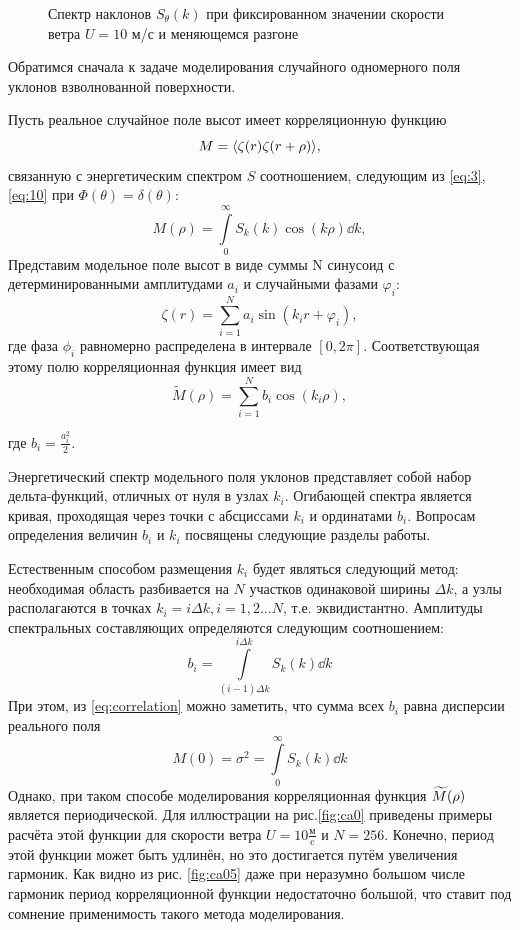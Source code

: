 \begin{figure}[h!]
\begin{minipage}{0.49\linewidth}
			\caption{Спектр наклонов $S_{\theta}(k)$ при фиксированном значении скорости ветра 
			$U=10$ м/с и меняющемся разгоне}		
			\label{fig:full_spectrum4}
	\end{minipage}
\end{figure}
Обратимся сначала к задаче моделирования случайного одномерного поля уклонов взволнованной поверхности. 

Пусть реальное случайное поле высот имеет корреляционную функцию 
\begin{equation}
	M=\langle\zeta(r) \zeta(r+\rho)\rangle,
\end{equation} связанную с энергетическим спектром $S$ соотношением, следующим из \eqref{eq:3}, \eqref{eq:10} при $\Phi(\theta)=\delta(\theta)$:
\begin{equation}
	\label{eq:correlation}
	M(\rho)= \int\limits_0^{\infty} S_k(k)\cos(k \rho) \dd{k}, 
\end{equation}
Представим модельное поле высот в виде суммы N синусоид с детерминированными амплитудами $a_i$ и случайными фазами $\varphi_i$:
\begin{equation}
	\zeta(r)=\sum_{i=1}^N a_i \sin(k_ir+\varphi_i), 
\end{equation}
где фаза $\phi_i$ равномерно распределена в интервале $[0,2\pi]$. Соответствующая этому полю корреляционная функция имеет вид
\begin{equation}
	\widetilde M(\rho)=\sum\limits_{i=1}^N b_i \cos(k_i \rho),
\end{equation}

где $b_i=\frac{a_i^2}{2}$.

Энергетический спектр модельного поля уклонов представляет собой набор дельта-функций, отличных от нуля в узлах $k_i$. Огибающей спектра является кривая, проходящая через точки с абсциссами $k_i$ и ординатами $b_i$. Вопросам определения величин $b_i$ и $k_i$ 
посвящены следующие разделы работы.

Естественным способом размещения $k_i$ будет являться следующий метод:
необходимая область разбивается на $N$ участков одинаковой ширины $\Delta k$, а узлы располагаются в точках $k_i=i \Delta k, i=1,2\dots N$, т.е. эквидистантно.
Амплитуды спектральных составляющих определяются следующим соотношением:
\begin{equation}
	b_i = \int\limits_{(i-1)\Delta k}^{i \Delta k} S_k(k) \dd{k}
\end{equation}
При этом, из \eqref{eq:correlation} можно заметить, что сумма всех $b_i$ равна дисперсии реального поля
\begin{equation}
	M(0)=\sigma^2=\int\limits_0^{\infty} S_k(k) \dd{k}
\end{equation}
Однако, при таком способе моделирования корреляционная функция $\widetilde{M}(\rho)$ является
периодической. Для иллюстрации на рис.\ref{fig:ca0} приведены примеры расчёта этой функции для скорости ветра $U=10 \frac{\text{м}}{\text{c}}$ и $N=256$. Конечно, период этой функции может быть удлинён, но это достигается путём увеличения гармоник.
Как видно из рис. \ref{fig:ca05} даже при неразумно большом числе гармоник период корреляционной функции недостаточно большой, что ставит под сомнение применимость такого метода моделирования.

